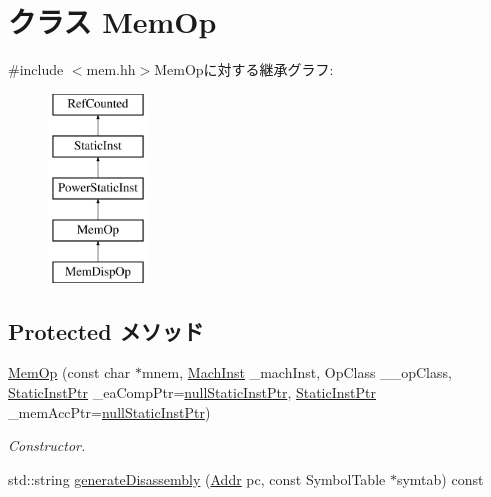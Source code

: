 \hypertarget{classPowerISA_1_1MemOp}{
\section{クラス MemOp}
\label{classPowerISA_1_1MemOp}
}


{\ttfamily \#include $<$mem.hh$>$}MemOpに対する継承グラフ:\begin{figure}[H]
\begin{center}
\leavevmode
\includegraphics[height=5cm]{classPowerISA_1_1MemOp}
\end{center}
\end{figure}
\subsection*{Protected メソッド}
\begin{DoxyCompactItemize}
\item 
\hyperlink{classPowerISA_1_1MemOp_a82838d0e5b22689b703bb2a6da001132}{MemOp} (const char $\ast$mnem, \hyperlink{namespacePowerISA_a301c22ea09fa33dcfe6ddf22f203699c}{MachInst} \_\-machInst, OpClass \_\-\_\-opClass, \hyperlink{classRefCountingPtr}{StaticInstPtr} \_\-eaCompPtr=\hyperlink{classStaticInst_aa793d9793af735f09096369fb17567b6}{nullStaticInstPtr}, \hyperlink{classRefCountingPtr}{StaticInstPtr} \_\-memAccPtr=\hyperlink{classStaticInst_aa793d9793af735f09096369fb17567b6}{nullStaticInstPtr})
\begin{DoxyCompactList}\small\item\em Constructor. \item\end{DoxyCompactList}\item 
std::string \hyperlink{classPowerISA_1_1MemOp_a95d323a22a5f07e14d6b4c9385a91896}{generateDisassembly} (\hyperlink{base_2types_8hh_af1bb03d6a4ee096394a6749f0a169232}{Addr} pc, const SymbolTable $\ast$symtab) const 
\end{DoxyCompactItemize}
